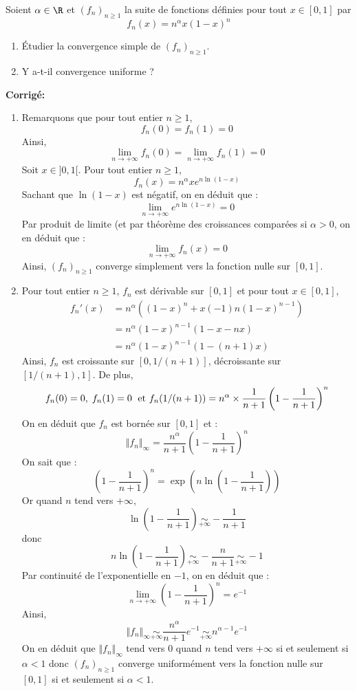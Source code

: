 \documentclass[a4paper,twoside,french,11pt]{VcCours}
\newcommand{\corr}{\textbf{Corrigé:}}
\begin{document}
\medskip


\begin{Exercice}{} Soient $\alpha \in \R$ et $(f_n)_{n \geq 1}$ la suite de fonctions définies pour tout $x \in [0,1]$ par 
$$f_n(x) = n^\alpha x(1-x)^n$$

\begin{enumerate}
 \item Étudier la convergence simple de $(f_n)_{n \geq 1}$.
 \item Y a-t-il convergence uniforme ?
  \end{enumerate}
\end{Exercice}

\newpage
\corr 

\begin{enumerate}
\item Remarquons que pour tout entier $n \geq 1$,
$$ f_n(0)=f_n(1)=0$$
Ainsi,
$$ \lim_{n \rightarrow + \infty} f_n(0) = \lim_{n \rightarrow + \infty} f_n(1) = 0$$
Soit $x \in ]0,1[$. Pour tout entier $n \geq 1$,
$$ f_n(x) = n^{\alpha} x e^{n \ln(1-x)}$$
Sachant que $\ln(1-x)$ est négatif, on en déduit que :
$$ \lim_{n \rightarrow + \infty}e^{n \ln(1-x)} = 0$$
Par produit de limite (et par théorème des croissances comparées si $\alpha>0$, on en déduit que :
$$ \lim_{n \rightarrow + \infty} f_n(x) = 0$$
Ainsi, $(f_n)_{n \geq 1}$ converge simplement vers la fonction nulle sur $[0,1]$.
\item Pour tout entier $n \geq 1$, $f_n$ est dérivable sur $[0,1]$ et pour tout $x \in [0,1]$,
\begin{align*}
 f_n'(x) & = n^{\alpha} ((1-x)^n + x (-1) n (1-x)^{n-1}) \\
 & = n^{\alpha} (1-x)^{n-1} (1-x-nx) \\
 & = n^{\alpha} (1-x)^{n-1} (1-(n+1)x) 
 \end{align*}
Ainsi, $f_n$ est croissante sur $[0, 1/(n+1)]$, décroissante sur $[1/(n+1), 1]$. De plus,
$$ f_n(0)=0, \; f_n(1)=0 \; \hbox{ et } f_n(1/(n+1)) =n^{\alpha} \times \dfrac{1}{n+1} \left(1- \dfrac{1}{n+1}\right)^{n}$$
On en déduit que $f_n$ est bornée sur $[0,1]$ et :
$$ \Vert f_n \Vert_{\infty} =   \dfrac{n^{\alpha}}{n+1} \left(1- \dfrac{1}{n+1}\right)^{n}$$
On sait que :
$$\left(1- \dfrac{1}{n+1}\right)^{n} = \exp \left(n \ln \left(1- \dfrac{1}{n+1}\right) \right) $$
Or quand $n$ tend vers $+ \infty$,
$$ \ln \left(1- \dfrac{1}{n+1}\right) \underset{+ \infty}{\sim} - \dfrac{1}{n+1}$$
donc 
$$ n \ln \left(1- \dfrac{1}{n+1}\right) \underset{+ \infty}{\sim} - \dfrac{n}{n+1} \underset{+ \infty}{\sim} -1$$
Par continuité de l'exponentielle en $-1$, on en déduit que :
$$ \lim_{n \rightarrow + \infty} \left(1- \dfrac{1}{n+1}\right)^{n} = e^{-1}$$
Ainsi,
$$  \Vert f_n \Vert_{\infty} \underset{+ \infty}{\sim} \dfrac{n^{\alpha}}{n+1} e^{-1} \underset{+ \infty}{\sim} n^{\alpha-1} e^{-1}$$
On en déduit que $\Vert f_n \Vert_{\infty}$ tend vers $0$ quand $n$ tend vers $+ \infty$ si et seulement si $\alpha<1$ donc $(f_n)_{n \geq 1}$ converge uniformément vers la fonction nulle sur $[0,1]$ si et seulement si $\alpha<1$.
\end{enumerate}
\end{document}

